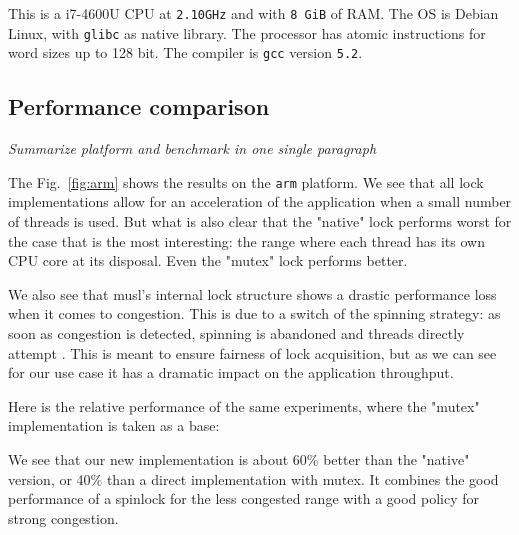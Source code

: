 This is a i7-4600U CPU at \texttt{2.10GHz} and with \texttt{8 GiB} of RAM. The
OS is Debian Linux, with \texttt{glibc} as native library.  The processor
has atomic instructions for word sizes up to 128 bit. The compiler
is \texttt{gcc} version \texttt{5.2}.

\subsection{Performance comparison}
\label{sec-4-4}
\else
\emph{Summarize platform and benchmark in one single paragraph}
\fi


The Fig.~\ref{fig:arm} shows the results on the \texttt{arm}
platform.
%
We see that all lock implementations allow for an acceleration of
the application when a small number of threads is used. But what is
also clear that the "native" lock performs worst for the case that
is the most interesting: the range where each thread has
its own CPU core at its disposal. Even the "mutex" lock performs better.

We also see that musl's internal lock structure shows a drastic
performance loss when it comes to congestion. This is due to a
switch of the spinning strategy: as soon as congestion is detected,
spinning is abandoned and threads directly attempt
. This is meant to ensure fairness of lock acquisition,
but as we can see for our use case it has a dramatic impact on the
application throughput.

Here is the relative performance of the same experiments, where the
"mutex" implementation is taken as a base:

We see that our new implementation is about 60\% better than
the "native" version, or 40\% than a direct implementation with
mutex. It combines the good performance of a spinlock for the less
congested range with a good policy for strong congestion.

